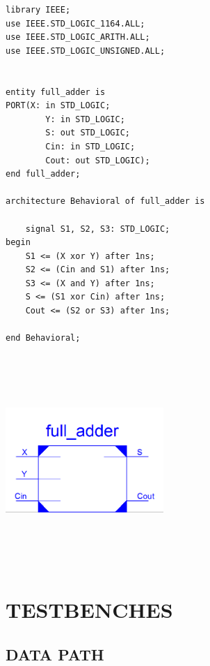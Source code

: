 \documentclass{article}
\begin{document}
\begin{lstlisting}
library IEEE;
use IEEE.STD_LOGIC_1164.ALL;
use IEEE.STD_LOGIC_ARITH.ALL;
use IEEE.STD_LOGIC_UNSIGNED.ALL;


entity full_adder is
PORT(X: in STD_LOGIC;
		Y: in STD_LOGIC;
		S: out STD_LOGIC;
		Cin: in STD_LOGIC;
		Cout: out STD_LOGIC);
end full_adder;

architecture Behavioral of full_adder is

	signal S1, S2, S3: STD_LOGIC;
begin
	S1 <= (X xor Y) after 1ns;
	S2 <= (Cin and S1) after 1ns;
	S3 <= (X and Y) after 1ns;
	S <= (S1 xor Cin) after 1ns;
	Cout <= (S2 or S3) after 1ns;

end Behavioral;
\end{lstlisting}

\includegraphics[width=6cm, height=8cm]{adder.png}
\pagebreak

\section{TESTBENCHES}

\subsection{DATA PATH}\label{sec:result}
\end{document}
